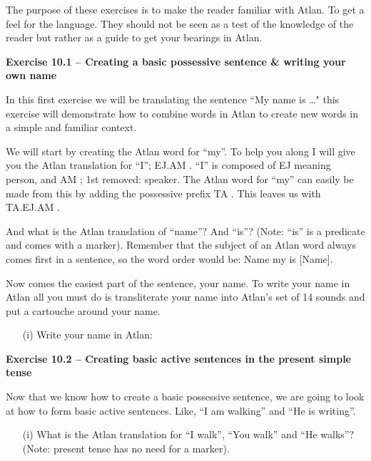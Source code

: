 

The purpose of these exercises is to make the reader familiar with Atlan. To get a feel for the language. They should not be seen as a test of the knowledge of the reader but rather as a guide to get your bearings in Atlan.  


\noindent \textbf{Exercise 10.1 -- Creating a basic possessive sentence \& writing your own name} 

In this first exercise we will be translating the sentence “My name is …" this exercise will demonstrate how to combine words in Atlan to create new words in a simple and familiar context. 

We will start by creating the Atlan word for “my”. To help you along I will give you the Atlan translation for “I”; EJ.AM \ej\am. “I” is composed of EJ \ej meaning person, and AM \am; 1st removed: speaker. The Atlan word for “my” can easily be made from this by adding the possessive prefix TA \ta. This leaves us with TA.EJ.AM \ta\ej\am.  

And what is the Atlan translation of “name”? And “is”? (Note: “is” is a predicate and comes with a marker). Remember that the subject of an Atlan word always comes first in a sentence, so the word order would be: Name my is [Name]. 

Now comes the easiest part of the sentence, your name. To write your name in Atlan all you must do is transliterate your name into Atlan’s set of 14 sounds and put a cartouche around  your name. %
\begin{itemize}
	\item[(i)] Write your name in Atlan:
	\vspace{0.3cm}
	\dotfill
\end{itemize}

\noindent \textbf{Exercise 10.2 -- Creating basic active sentences in the present simple tense} 

Now that we know how to create a basic possessive sentence, we are going to look at how to form basic active sentences. Like, “I am walking” and “He is writing”.  
\begin{itemize}
\item[(i)] What is the Atlan translation for “I walk”, “You walk” and “He walks”? (Note: present tense has no need for a marker).  
\end{itemize}

